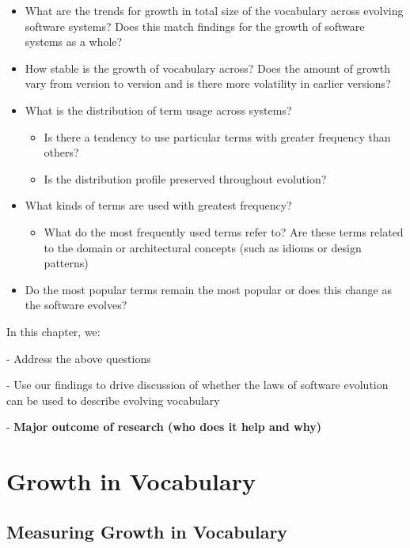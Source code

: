 \begin{itemize}
	\item What are the trends for growth in total size of the vocabulary across evolving software systems? Does this match findings for the growth of software systems as a whole?
	\item How stable is the growth of vocabulary across? Does the amount of growth vary from version to version and is there more volatility in earlier versions?
	
	\item What is the distribution of term usage across systems?
		\begin{itemize}
			\item Is there a tendency to use particular terms with greater frequency than others? 
			\item Is the distribution profile preserved throughout evolution?
		\end{itemize}
	
	\item What kinds of terms are used with greatest frequency?
		\begin{itemize}
			\item What do the most frequently used terms refer to? Are these terms related to the domain or architectural concepts (such as idioms or design patterns)
		\end{itemize}
	\item Do the most popular terms remain the most popular or does this change as the software evolves?
\end{itemize}

\excrumbs
{
In this chapter, we:

- Address the above questions

- Use our findings to drive discussion of whether the laws of software evolution can be used to describe evolving vocabulary

- \textbf{Major outcome of research (who does it help and why)}
}

\section{Growth in Vocabulary} %
\label{sec:growth_in_vocabulary}

\subsection{Measuring Growth in Vocabulary} %
\label{sub:measuring_growth_in_vocabulary}

